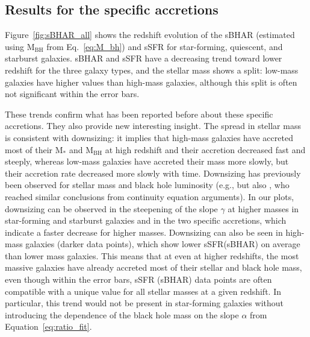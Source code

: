 \subsection{Results for the specific accretions}
Figure~\ref{fig:sBHAR_all} shows the redshift evolution of the sBHAR (estimated using $\text{M}_{\text{BH}}$ from Eq.~\ref{eq:M_bh}) and sSFR for star-forming, quiescent, and starburst galaxies.
sBHAR and sSFR have a decreasing trend toward lower redshift for the three galaxy types, and the stellar mass shows a split: low-mass galaxies have higher values than high-mass galaxies, although this split is often not significant within the error bars.

        These trends confirm what has been reported before about these specific accretions. They also  provide new interesting insight.
        The spread in stellar mass is consistent with downsizing: it implies that high-mass galaxies have accreted most of their M$_*$ and M$_\text{BH}$ at high redshift and their accretion decreased fast and steeply, whereas low-mass galaxies have accreted their mass more slowly, but   their accretion rate decreased more slowly with  time. Downsizing has previously been observed for stellar mass \citep{1996AJ....112..839C, 2006A&A...453L..29C} and black hole luminosity (e.g., \citealt{2004MNRAS.351..169M} but also \citealt{2004MNRAS.354.1020S, 2009ApJ...690...20S, 2015ApJ...810...74A}, who reached similar conclusions from continuity equation arguments). 
        In our plots, downsizing can be observed in the steepening of the slope $\gamma$ at higher masses in star-forming and starburst galaxies and in the two specific accretions, which indicate a faster decrease for higher masses. Downsizing can also be seen in
        high-mass galaxies (darker data points), which show lower sSFR(sBHAR) on average than lower mass galaxies. This means that at even at higher redshifts, the most massive galaxies have already accreted most of their stellar and black hole mass, even though within the error bars, sSFR (sBHAR) data points are often compatible with a unique value for all stellar masses at a given redshift. In particular, this trend would not be present in star-forming galaxies without introducing the dependence of the black hole mass on the slope $\alpha$ from Equation~\ref{eq:ratio_fit}.

